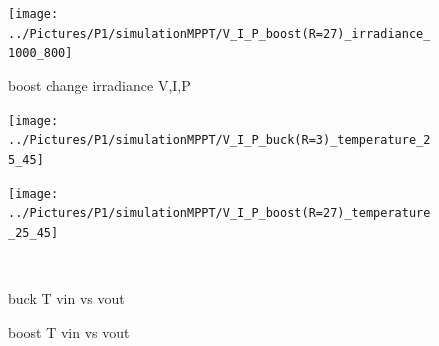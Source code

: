 \begin{figure}[H]
	\begin{center}
		\texttt{[image: ../Pictures/P1/simulationMPPT/V\_I\_P\_boost(R=27)\_irradiance\_1000\_800]}
		\caption{boost change irradiance V,I,P}
		\label{boostirradiance} 
	\end{center}	
\end{figure}
\fi

\vspace{1cm}
\begin{figure}[H]
	\begin{minipage}[c]{0.6\textwidth}
		\centering
		\texttt{[image: ../Pictures/P1/simulationMPPT/V\_I\_P\_buck(R=3)\_temperature\_25\_45]} %
	\end{minipage}%
	\hfill
	\begin{minipage}[c]{0.6\textwidth}
		\centering
		\texttt{[image: ../Pictures/P1/simulationMPPT/V\_I\_P\_boost(R=27)\_temperature\_25\_45]} %
	\end{minipage} \\ %
	\begin{minipage}[t]{0.6\textwidth}
		\caption{buck T vin vs vout} %
		\label{bucktemperature}
	\end{minipage}%
	\hfill
	\begin{minipage}[t]{0.6\textwidth}
		\caption{boost T vin vs vout} %
		\label{boosttemperature}
	\end{minipage}
\end{figure}

